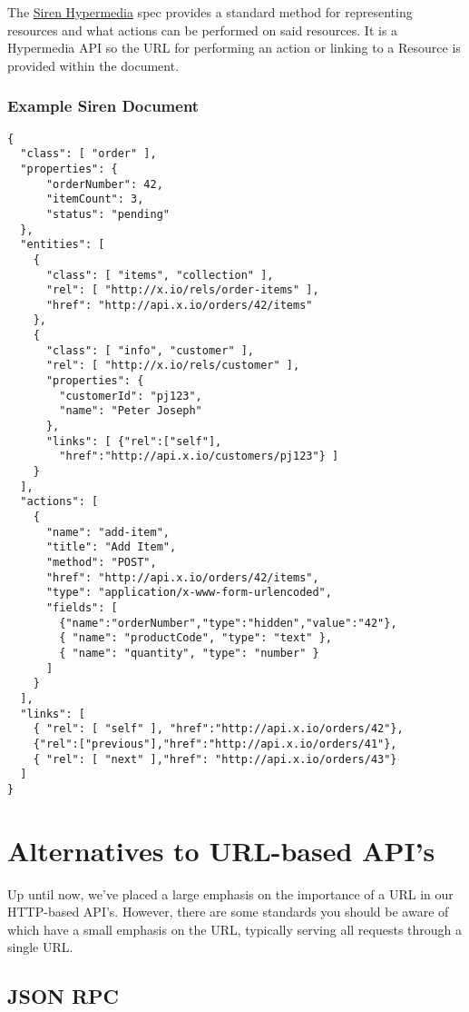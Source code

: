 The \href{http://sirenspec.org}{Siren Hypermedia} \cite{SIREN} spec provides a standard method for representing resources and what actions can be performed on said resources. It is a Hypermedia API so the URL for performing an action or linking to a Resource is provided within the document.

\subsubsection{Example Siren Document}

\begin{verbatim}
{
  "class": [ "order" ],
  "properties": { 
      "orderNumber": 42, 
      "itemCount": 3,
      "status": "pending"
  },
  "entities": [
    { 
      "class": [ "items", "collection" ], 
      "rel": [ "http://x.io/rels/order-items" ], 
      "href": "http://api.x.io/orders/42/items"
    },
    {
      "class": [ "info", "customer" ],
      "rel": [ "http://x.io/rels/customer" ], 
      "properties": { 
        "customerId": "pj123",
        "name": "Peter Joseph"
      },
      "links": [ {"rel":["self"],
        "href":"http://api.x.io/customers/pj123"} ]
    }
  ],
  "actions": [
    {
      "name": "add-item",
      "title": "Add Item",
      "method": "POST",
      "href": "http://api.x.io/orders/42/items",
      "type": "application/x-www-form-urlencoded",
      "fields": [
        {"name":"orderNumber","type":"hidden","value":"42"},
        { "name": "productCode", "type": "text" },
        { "name": "quantity", "type": "number" }
      ]
    }
  ],
  "links": [
    { "rel": [ "self" ], "href":"http://api.x.io/orders/42"},
    {"rel":["previous"],"href":"http://api.x.io/orders/41"},
    { "rel": [ "next" ],"href": "http://api.x.io/orders/43"}
  ]
}
\end{verbatim}


\section{Alternatives to URL-based API's}

Up until now, we've placed a large emphasis on the importance of a URL in our HTTP-based API's. However, there are some standards you should be aware of which have a small emphasis on the URL, typically serving all requests through a single URL.

\subsection{JSON RPC}

